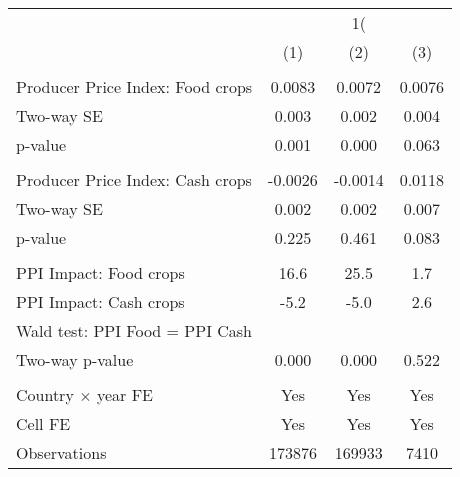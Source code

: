 {
\def\sym#1{\ifmmode^{#1}\else\(^{#1}\)\fi}
\begin{tabular}{l*{3}{c}}
\hline\hline
                    &&&\\\cmidrule(lr){2-2}\cmidrule(lr){3-3}\cmidrule(lr){4-4}
                    &         &         &         \\
\hline
\hline
\\ Producer Price Index: Food crops&      0.0083         &      0.0072         &      0.0076         \\
\hspace{15pt} Two-way SE &       0.003         &       0.002         &       0.004         \\
\hspace{25pt} p-value&       0.001         &       0.000         &       0.063         \\
\\  Producer Price Index: Cash crops&     -0.0026         &     -0.0014         &      0.0118         \\
\hspace{15pt} Two-way SE&       0.002         &       0.002         &       0.007         \\
\hspace{25pt} p-value&       0.225         &       0.461         &       0.083         \\
\hline \\ PPI Impact: Food crops&        16.6         &        25.5         &         1.7         \\
PPI Impact: Cash crops&        -5.2         &        -5.0         &         2.6         \\
Wald test: PPI Food = PPI Cash&                     &                     &                     \\
\hspace{15pt} Two-way p-value&       0.000         &       0.000         &       0.522         \\
\hline \\ Country $\times$ year FE&         Yes         &         Yes         &         Yes         \\
Cell FE             &         Yes         &         Yes         &         Yes         \\
Observations        &      173876         &      169933         &        7410         \\
\hline\hline
\end{tabular}
}
